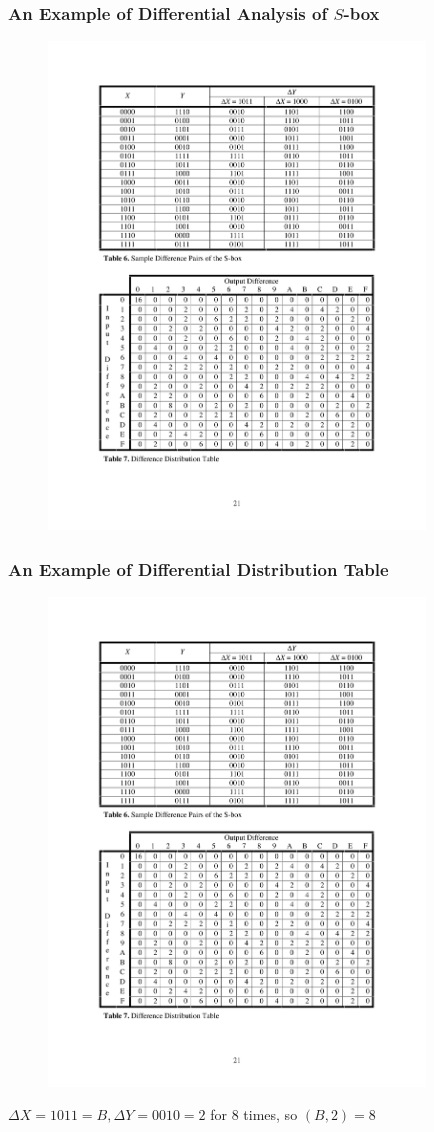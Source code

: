 \begin{frame}\frametitle{An Example of Differential Analysis of $S$-box}
\begin{figure}
\begin{center}
\includegraphics[width=100mm]{pic/difference-sbox} 
\end{center}
\end{figure}
\end{frame}
\begin{frame}\frametitle{An Example of Differential Distribution Table}
\begin{figure}
\begin{center}
\includegraphics[width=100mm]{pic/difference-table} 
\end{center}
\end{figure}
$\Delta X = 1011 = B, \Delta Y = 0010 = 2$ for 8 times, so $(B, 2) = 8$
\end{frame}
